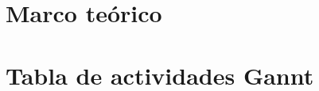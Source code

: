 \documentclass[12pt,a4paper]{article}
\newcommand{\vect}[1]{\mathbf{#1}}
\newcommand{\mat}[1]{\mathbf{#1}}
\begin{document}
	
	
	\section{Marco teórico}
	\label{sec:modelo}

	\section{Tabla de actividades Gannt}
	
	\vspace{0.5cm}
	
\end{document}
